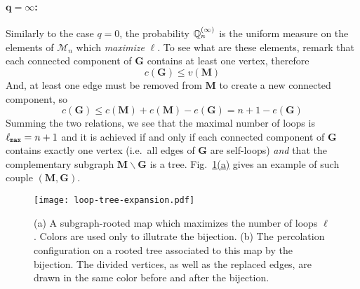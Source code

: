 \documentclass[a4paper]{article}
\newcommand{\refnote}[2]{\hyperref[#1]{\ref*{#1}#2}}
\newcommand*{\map}{\mathbf}
\newcommand*{\M}{\mathcal{M}}
\begin{document}
\paragraph{$\mathbf{q=\infty}$:}
Similarly to the case $q=0$, the probability $\proba[Q]_n\ind{\infty}$ is the uniform measure on the elements of $\M_n$ which \emph{maximize} $\ell$.
To see what are these elements, remark that each connected component of $\map{G}$ contains at least one vertex, therefore
\begin{equation}
	c(\map{G}) \leq v(\map{M})
\end{equation}
And, at least one edge must be removed from $\map{M}$ to create a new connected component, so
\begin{equation}
	c(\map{G}) \leq c(\map{M}) + e(\map{M}) - e(\map{G}) = n+1 -e(\map{G})
\end{equation}
Summing the two relations, we see that the maximal number of loops is $\ell\sub{max}=n+1$ and it is achieved if and only if each connected component of $\map{G}$ contains exactly one vertex (i.e.\ all edges of $\map{G}$ are self-loops) \emph{and} that the complementary subgraph $\map{M\backslash G}$ is a tree.
Fig.~\refnote{fig:loop tree}{(a)} gives an example of such couple $(\map{M,G})$.

\begin{figure}[ht!]
\captionsetup{width=0.8\textwidth}
\begin{center}
\texttt{[image: loop-tree-expansion.pdf]}
\caption{(a) A subgraph-rooted map which maximizes the number of loops $\ell$.
Colors are used only to illutrate the bijection.
(b) The percolation configuration on a rooted tree associated to this map by the bijection.
The divided vertices, as well as the replaced edges, are drawn in the same color before and after the bijection.
}
\label{fig:loop tree}
\end{center}
\end{figure}
\end{document}
